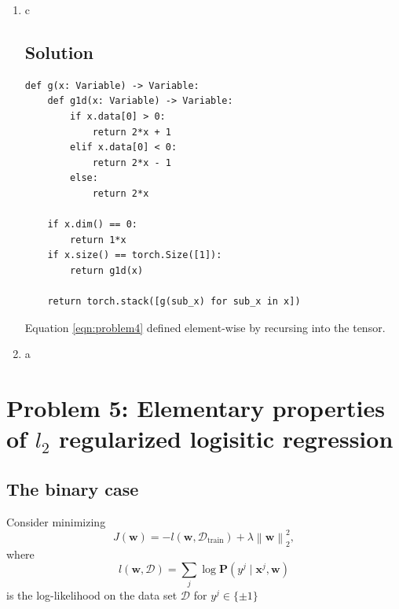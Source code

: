 \documentclass[letterpaper,11pt]{article}
\begin{document}
\begin{enumerate}
\item c
  \subsection*{Solution}
\begin{listing}
\begin{verbatim}
def g(x: Variable) -> Variable:
    def g1d(x: Variable) -> Variable:
        if x.data[0] > 0:
            return 2*x + 1
        elif x.data[0] < 0:
            return 2*x - 1
        else:
            return 2*x

    if x.dim() == 0:
        return 1*x    
    if x.size() == torch.Size([1]):
        return g1d(x)

    return torch.stack([g(sub_x) for sub_x in x])
\end{verbatim}
  \caption{Equation \ref{eqn:problem4} defined element-wise by recursing into the tensor.}
\label{lst:g}
\end{listing}
\item a
\end{enumerate}

\section*{Problem 5: Elementary properties of $l_2$ regularized logisitic regression}

\subsection*{The binary case}

Consider minimizing
\begin{equation}
  J(\mathbf{w}) = -l\left(\mathbf{w},\mathcal{D}_\mathrm{train}\right) + \lambda\left\lVert\mathbf{w}\right\rVert_2^2,
\end{equation}
where
\begin{equation}
  l\left(\mathbf{w},\mathcal{D}\right) = \sum_j \log \mathbf{P}\left(
    y^j \mid \mathbf{x}^j, \mathbf{w}
  \right)
\end{equation}
is the log-likelihood on the data set $\mathcal{D}$ for $y^j \in \{
\pm 1
\}$
\end{document}
